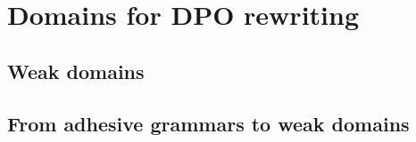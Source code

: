 \chapter{Domains for DPO rewriting}
\section{Weak domains}
\section{From adhesive grammars to weak domains}